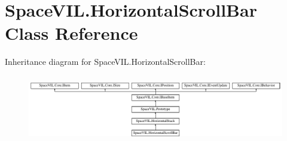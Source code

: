 \hypertarget{class_space_v_i_l_1_1_horizontal_scroll_bar}{}\section{Space\+V\+I\+L.\+Horizontal\+Scroll\+Bar Class Reference}
\label{class_space_v_i_l_1_1_horizontal_scroll_bar}
Inheritance diagram for Space\+V\+I\+L.\+Horizontal\+Scroll\+Bar\+:\begin{figure}[H]
\begin{center}
\leavevmode
\includegraphics[height=2.962963cm]{class_space_v_i_l_1_1_horizontal_scroll_bar}
\end{center}
\end{figure}
